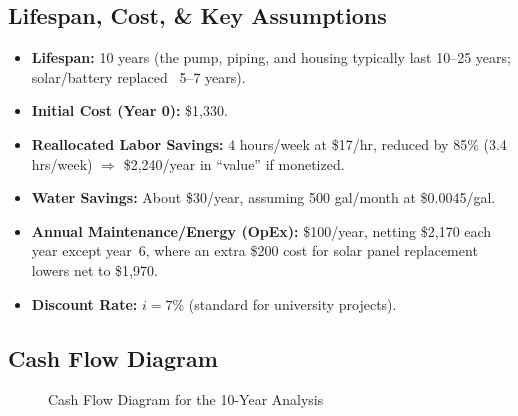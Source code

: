\documentclass[12pt]{article}
\begin{document}
\subsection*{Lifespan, Cost, \& Key Assumptions}

\begin{itemize}
    \item \textbf{Lifespan:} 10 years (the pump, piping, and housing typically last 10--25 years; solar/battery replaced ~5--7 years).
    \item \textbf{Initial Cost (Year 0):} \$1{,}330.
    \item \textbf{Reallocated Labor Savings:} 4 hours/week at \$17/hr, reduced by 85\% (3.4 hrs/week) $\Rightarrow$ \$2{,}240/year in “value” if monetized.
    \item \textbf{Water Savings:} About \$30/year, assuming 500 gal/month at \$0.0045/gal.
    \item \textbf{Annual Maintenance/Energy (OpEx):} \$100/year, netting \$2{,}170 each year except year~6, where an extra \$200 cost for solar panel replacement lowers net to \$1{,}970.
    \item \textbf{Discount Rate:} $i=7\%$ (standard for university projects).
\end{itemize}

\vspace{1em}

\subsection*{Cash Flow Diagram}

\begin{figure}[h]
\centering
{}
\caption{Cash Flow Diagram for the 10-Year Analysis}
\label{fig:analysis-cashflow}
\end{figure}
\end{document}
